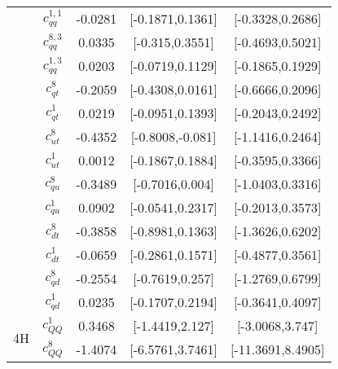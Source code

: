 \documentclass{article}
\begin{document}
\begin{table}[H]
\begin{tabular}{|c|c|c|c|c|}
 & $c_{qq}^{1,1}$ & -0.0281                             & [-0.1871,0.1361]                                 & [-0.3328,0.2686] \\ \cline{2-5}
 & $c_{qq}^{8,3}$ & 0.0335                             & [-0.315,0.3551]                                 & [-0.4693,0.5021] \\ \cline{2-5}
 & $c_{qq}^{1,3}$ & 0.0203                             & [-0.0719,0.1129]                                 & [-0.1865,0.1929] \\ \cline{2-5}
 & $c_{qt}^{8}$ & -0.2059                             & [-0.4308,0.0161]                                 & [-0.6666,0.2096] \\ \cline{2-5}
 & $c_{qt}^{1}$ & 0.0219                             & [-0.0951,0.1393]                                 & [-0.2043,0.2492] \\ \cline{2-5}
 & $c_{ut}^{8}$ & -0.4352                             & [-0.8008,-0.081]                                 & [-1.1416,0.2464] \\ \cline{2-5}
 & $c_{ut}^{1}$ & 0.0012                             & [-0.1867,0.1884]                                 & [-0.3595,0.3366] \\ \cline{2-5}
 & $c_{qu}^{8}$ & -0.3489                             & [-0.7016,0.004]                                 & [-1.0403,0.3316] \\ \cline{2-5}
 & $c_{qu}^{1}$ & 0.0902                             & [-0.0541,0.2317]                                 & [-0.2013,0.3573] \\ \cline{2-5}
 & $c_{dt}^{8}$ & -0.3858                             & [-0.8981,0.1363]                                 & [-1.3626,0.6202] \\ \cline{2-5}
 & $c_{dt}^{1}$ & -0.0659                             & [-0.2861,0.1571]                                 & [-0.4877,0.3561] \\ \cline{2-5}
 & $c_{qd}^{8}$ & -0.2554                             & [-0.7619,0.257]                                 & [-1.2769,0.6799] \\ \cline{2-5}
 & $c_{qd}^{1}$ & 0.0235                             & [-0.1707,0.2194]                                 & [-0.3641,0.4097] \\ \cline{2-5}
\hline
\multirow{5}{*}{4H}
 & $c_{QQ}^{1}$ & 0.3468                             & [-1.4419,2.127]                                 & [-3.0068,3.747] \\ \cline{2-5}
 & $c_{QQ}^{8}$ & -1.4074                             & [-6.5761,3.7461]                                 & [-11.3691,8.4905] \\ \cline{2-5}

\end{tabular}
\end{table}
\end{document}
